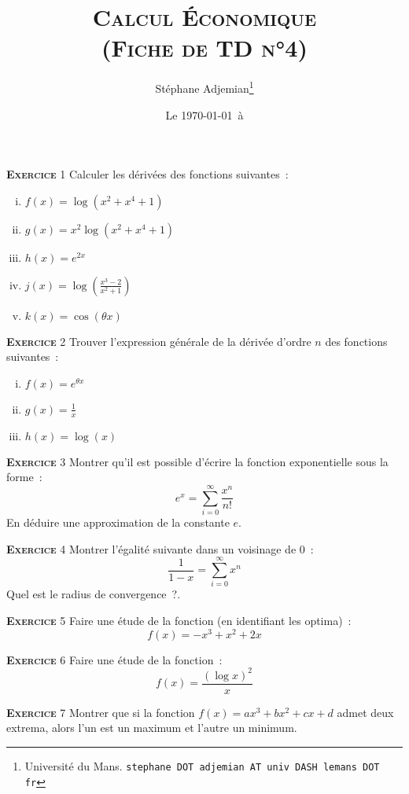 \documentclass[10pt,a4paper,notitlepage]{article}
\newcommand{\exercice}[1]{\textsc{\textbf{Exercice}} #1}
\begin{document}
\title{\textsc{Calcul Économique\\ \small{(Fiche de TD n°4)}}}
\author{Stéphane Adjemian\thanks{Université du Mans. \texttt{stephane DOT adjemian AT univ DASH lemans DOT fr}}}
\date{Le \today\ à \thistime}

\maketitle

\exercice{1} Calculer les dérivées des fonctions suivantes :
\begin{enumerate}[(i)]
\item $f(x) = \log (x^2+x^4+1)$
\item $g(x) = x^2\log (x^2+x^4+1)$
\item $h(x) = e^{2x}$
\item $j(x) = \log \left(\frac{x^3-2}{x^2+1}\right)$
\item $k(x) = \cos(\theta x)$
\end{enumerate}

\bigskip

\exercice{2} Trouver l'expression générale de la dérivée d'ordre $n$ des
fonctions suivantes :
\begin{enumerate}[(i)]
\item $f(x) = e^{\theta x}$
\item $g(x) = \frac{1}{x}$
\item $h(x) = \log (x)$
\end{enumerate}

\bigskip

\exercice{3} Montrer qu'il est possible d'écrire la fonction
exponentielle sous la forme :
\[
e^{x} = \sum_{i=0}^{\infty} \frac{x^n}{n!}
\]
En déduire une approximation de la constante $e$.

\bigskip

\exercice{4} Montrer l'égalité suivante dans un voisinage de 0 :
\[
\frac{1}{1-x} = \sum_{i=0}^{\infty} x^n
\]
Quel est le radius de convergence ?.

\bigskip

\exercice{5} Faire une étude de la fonction (en identifiant les optima) :
\[
f(x) = -x^3+x^2+2x
\]

\bigskip

\exercice{6} Faire une étude de la fonction :
\[
f(x) = \frac{(\log x)^2}{x}
\]

\bigskip

\exercice{7} Montrer que si la fonction $f(x)=ax^3+bx^2+cx+d$ admet
deux extrema, alors l'un est un maximum et l'autre un minimum.
\end{document}
